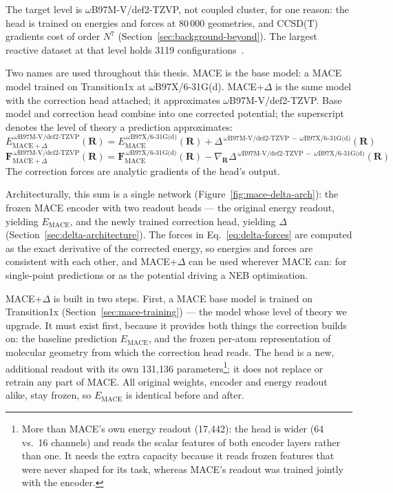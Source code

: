 The target level is \mbox{$\omega$B97M-V/def2-TZVP}, not coupled
cluster, for one reason: the head is trained on energies and forces at
80\,000 geometries, and CCSD(T) gradients cost of order $N^7$
(Section~\ref{sec:background-beyond}). The largest reactive dataset at
that level holds 3119 configurations~\cite{allen2026}.

Two names are used throughout this thesis. MACE is the base model: a
MACE model trained on Transition1x at \mbox{$\omega$B97X/6-31G(d)}.
MACE+$\Delta$ is the same model with the correction head attached; it
approximates \mbox{$\omega$B97M-V/def2-TZVP}. Base model and
correction head combine into one corrected potential; the superscript
denotes the level of theory a prediction approximates:
%
\begin{equation}
E_{\text{MACE}+\Delta}^{\,\omega\text{B97M-V/def2-TZVP}}(\mathbf{R})
=
E_{\text{MACE}}^{\,\omega\text{B97X/6-31G(d)}}(\mathbf{R})
+ \Delta^{\,\omega\text{B97M-V/def2-TZVP}\,-\,\omega\text{B97X/6-31G(d)}}(\mathbf{R})
\label{eq:delta-energy}
\end{equation}
%
\begin{equation}
\mathbf{F}_{\text{MACE}+\Delta}^{\,\omega\text{B97M-V/def2-TZVP}}(\mathbf{R})
=
\mathbf{F}_{\text{MACE}}^{\,\omega\text{B97X/6-31G(d)}}(\mathbf{R})
- \nabla_{\mathbf{R}}\Delta^{\,\omega\text{B97M-V/def2-TZVP}\,-\,\omega\text{B97X/6-31G(d)}}(\mathbf{R})
\label{eq:delta-forces}
\end{equation}
%
The correction forces are analytic gradients of the head's output.

Architecturally, this sum is a single network
(Figure~\ref{fig:mace-delta-arch}): the frozen MACE encoder with two
readout heads --- the original energy readout, yielding
$E_{\text{MACE}}$, and the newly trained correction head, yielding
$\Delta$ (Section~\ref{sec:delta-architecture}). The forces in
Eq.~\eqref{eq:delta-forces} are computed as the exact derivative of the
corrected energy, so energies and forces are consistent with each
other, and MACE+$\Delta$ can be used wherever MACE can: for
single-point predictions or as the potential driving a NEB
optimisation.

MACE+$\Delta$ is built in two steps. First, a MACE base model is trained on
Transition1x (Section~\ref{sec:mace-training}) --- the model whose level of theory we upgrade. It
must exist first, because it provides both things the correction builds on:
the baseline prediction $E_{\text{MACE}}$, and the frozen per-atom
representation of molecular geometry from which the correction head reads.
The head is a new, additional readout with its own 131{,}136
parameters\footnote{More than MACE's own energy readout (17{,}442): the head
is wider (64 vs.\ 16 channels) and reads the scalar features of both encoder
layers rather than one. It needs the extra capacity because it reads frozen
features that were never shaped for its task, whereas MACE's readout was
trained jointly with the encoder.}; it does not replace or retrain any part
of MACE. All original weights, encoder and energy readout alike, stay frozen,
so $E_{\text{MACE}}$ is identical before and after.

